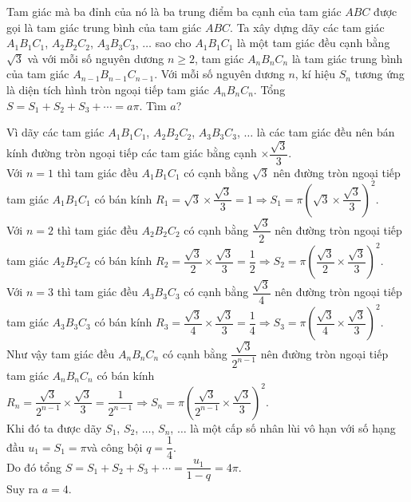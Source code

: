\caukq
\begin{ex}%
	Tam giác mà ba đỉnh của nó là ba trung điểm ba cạnh của tam giác $ABC$ được gọi là tam giác trung bình của tam giác $ABC$. Ta xây dựng dãy các tam giác $A_1B_1C_1$, $A_2B_2C_2$, $A_3B_3C_3$, $\ldots$ sao cho $A_1B_1C_1$ là một tam giác đều cạnh bằng $\sqrt{3}$ và với mỗi số nguyên dương $n \geq 2$, tam giác $A_nB_nC_n$ là tam giác trung bình của tam giác $A_{n-1}B_{n-1}C_{n-1}$. Với mỗi số nguyên dương $n$, kí hiệu $S_n$ tương ứng là diện tích hình tròn ngoại tiếp tam giác $A_nB_nC_n$. Tổng $S = S_1 + S_2 + S_3 + \cdots = a\pi$. Tìm $a$?
	
	\loigiai
	{
		Vì dãy các tam giác $A_1B_1C_1$, $A_2B_2C_2$, $A_3B_3C_3$, $\ldots$ là các tam giác đều nên bán kính đường tròn ngoại tiếp các tam giác bằng cạnh $\times \dfrac{\sqrt{3}}{3}$.\\
		Với $n = 1$ thì tam giác đều $A_1B_1C_1$ có cạnh bằng $\sqrt{3}$ nên đường tròn ngoại tiếp tam giác $A_1B_1C_1$ có bán kính $R_1 = \sqrt{3} \times \dfrac{\sqrt{3}}{3} = 1 \Rightarrow S_1 = \pi \left( \sqrt{3} \times \dfrac{\sqrt{3}}{3} \right)^2$.\\
		Với $n = 2$ thì tam giác đều $A_2B_2C_2$ có cạnh bằng $\dfrac{\sqrt{3}}{2}$ nên đường tròn ngoại tiếp tam giác $A_2B_2C_2$ có bán kính $R_2 = \dfrac{\sqrt{3}}{2} \times \dfrac{\sqrt{3}}{3} = \dfrac{1}{2} \Rightarrow S_2 = \pi \left( \dfrac{\sqrt{3}}{2} \times \dfrac{\sqrt{3}}{3} \right)^2$.\\
		Với $n = 3$ thì tam giác đều $A_3B_3C_3$ có cạnh bằng $\dfrac{\sqrt{3}}{4}$ nên đường tròn ngoại tiếp tam giác $A_3B_3C_3$ có bán kính $R_3 = \dfrac{\sqrt{3}}{4} \times \dfrac{\sqrt{3}}{3} = \dfrac{1}{4} \Rightarrow S_3 = \pi \left( \dfrac{\sqrt{3}}{4} \times \dfrac{\sqrt{3}}{3} \right)^2$.\\
		Như vậy tam giác đều $A_nB_nC_n$ có cạnh bằng $\dfrac{\sqrt{3}}{2^{n-1}}$ nên đường tròn ngoại tiếp tam giác $A_nB_nC_n$ có bán kính $R_n = \dfrac{\sqrt{3}}{2^{n-1}} \times \dfrac{\sqrt{3}}{3} = \dfrac{1}{2^{n-1}} \Rightarrow S_n = \pi \left( \dfrac{\sqrt{3}}{2^{n-1}} \times \dfrac{\sqrt{3}}{3} \right)^2$.\\
		Khi đó ta được dãy $S_1$, $S_2$, $\ldots$, $S_n$, $\ldots$ là một cấp số nhân lùi vô hạn với số hạng đầu $u_1 = S_1 = \pi$và công bội $q = \dfrac{1}{4}$.\\
		Do đó tổng $S = S_1 + S_2 + S_3 + \cdots = \dfrac{u_1}{1 - q} = 4\pi$.\\
		Suy ra $a = 4$.
	}
\end{ex}


